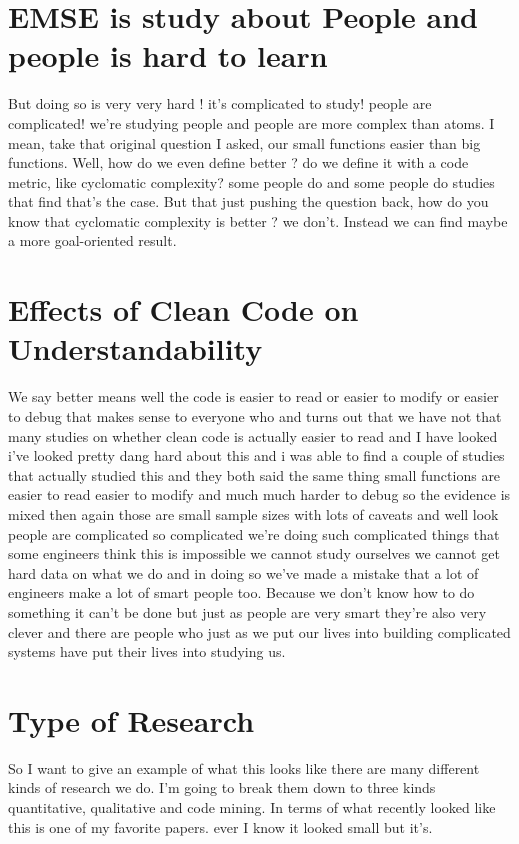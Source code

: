 \documentclass[conference, compsoc, twoside]{IEEEtran}
\begin{document}
\section{EMSE is study about People and people is hard to learn}
But doing so is very very hard ! 
it's complicated to study! people are complicated! 
we're studying people and people are more complex than atoms.
I mean, take that original question I asked, our small functions easier than big functions.
Well, how do we even define better ? do we define it with a code metric, like cyclomatic complexity? 
some people do and some people do studies that find that's the case. 
But that just pushing the question back, 
how do you know that cyclomatic complexity is better ? 
we don't. Instead we can find maybe a more goal-oriented result. 

\section{Effects of Clean Code on Understandability}
We say better means well the code is easier to read or easier to modify or easier to
debug that makes sense to everyone who
and turns out that we have not that many
studies on whether clean code is
actually easier to read and I have looked i've looked pretty dang hard
about this and i was able to find a
couple of studies that actually studied
this and they both said the same thing
small functions are easier to read
easier to modify and much much harder to
debug so the evidence is mixed then
again those are small sample sizes with
lots of caveats and well look people are
complicated so complicated we're doing
such complicated things that some
engineers think this is impossible we
cannot study ourselves we cannot get
hard data on what we do and in doing so we've made a mistake that a lot of engineers make a lot of smart people too.
Because we don't know how to do something it can't be done but just as people are very smart they're also very
clever and there are people who just as we put our lives into building
complicated systems have put their lives into studying us.
\section{Type of Research} %
\label{sec:type_of_research}


So I want to give an example of what this looks like there are many different kinds of research we do.
I'm going to break them down to three kinds quantitative, qualitative and code mining.
In terms of what recently looked like this is one of my favorite papers.
ever I know it looked small but it's.
\end{document}
